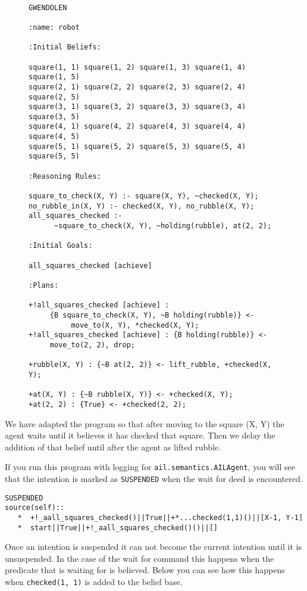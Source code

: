 \begin{figure}[!htb]
\begin{ourexample}
\label{code:pickuprubble_waitfor} \quad \\
\begin{lstlisting}[basicstyle=\sffamily,style=easslisting,language=Gwendolen]
GWENDOLEN

:name: robot

:Initial Beliefs:

square(1, 1) square(1, 2) square(1, 3) square(1, 4) square(1, 5)
square(2, 1) square(2, 2) square(2, 3) square(2, 4) square(2, 5)
square(3, 1) square(3, 2) square(3, 3) square(3, 4) square(3, 5)
square(4, 1) square(4, 2) square(4, 3) square(4, 4) square(4, 5)
square(5, 1) square(5, 2) square(5, 3) square(5, 4) square(5, 5)

:Reasoning Rules:

square_to_check(X, Y) :- square(X, Y), ~checked(X, Y);
no_rubble_in(X, Y) :- checked(X, Y), no_rubble(X, Y);
all_squares_checked :-
      ~square_to_check(X, Y), ~holding(rubble), at(2, 2);

:Initial Goals:

all_squares_checked [achieve]

:Plans:

+!all_squares_checked [achieve] : 
     {B square_to_check(X, Y), ~B holding(rubble)} <- 
          move_to(X, Y), *checked(X, Y);
+!all_squares_checked [achieve] : {B holding(rubble)} <- 
     move_to(2, 2), drop;

+rubble(X, Y) : {~B at(2, 2)} <- lift_rubble, +checked(X, Y);

+at(X, Y) : {~B rubble(X, Y)} <- +checked(X, Y);
+at(2, 2) : {True} <- +checked(2, 2);
\end{lstlisting}
\end{ourexample}
\end{figure}
We have adapted the program so that after moving to the square (X, Y)
the agent waits until it believes it has checked that square.  Then we
delay the addition of that belief until after the agent as lifted
rubble. 

If you run this program with logging for
\texttt{ail.semantics.AILAgent}, you will see that the intention is marked as
\texttt{SUSPENDED} when the wait for deed is
encountered. 
\begin{verbatim}
SUSPENDED
source(self):: 
   *  +!_aall_squares_checked()||True||+*...checked(1,1)()||[X-1, Y-1]
   *  start||True||+!_aall_squares_checked()()||[]
\end{verbatim}
Once an intention is suspended it can not become the current intention until it is unsuspended.  In the case of the wait for command this happens when the predicate that is waiting for is believed.  Below you can see how this happens when \texttt{checked(1, 1)} is added to the belief base.

